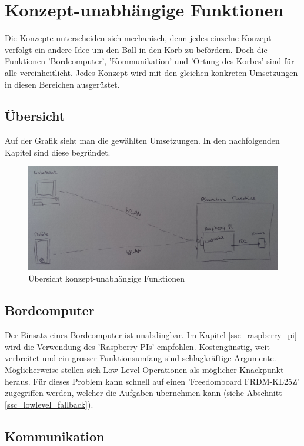 \section{Konzept-unabhängige Funktionen}
Die Konzepte unterscheiden sich mechanisch, denn jedes einzelne Konzept verfolgt ein andere Idee um den Ball in den Korb zu befördern. Doch die Funktionen 'Bordcomputer', 'Kommunikation' und 'Ortung des Korbes' sind für alle vereinheitlicht. Jedes Konzept wird mit den gleichen konkreten Umsetzungen in diesen Bereichen ausgerüstet.

\subsection{Übersicht}
Auf der Grafik sieht man die gewählten Umsetzungen. In den nachfolgenden Kapitel sind diese begründet.

\begin{figure}[h!]
	\centering
	\includegraphics[scale=0.15]{../../fig/konzeptunabhaengige_funktionen_overview.jpg}
	\caption{Übersicht konzept-unabhängige Funktionen}
	\label{fig:konzept1}
\end{figure}

\subsection{Bordcomputer}
Der Einsatz eines Bordcomputer ist unabdingbar. Im Kapitel \ref{ssc_raspberry_pi} wird die Verwendung des 'Raspberry PIs' empfohlen. Kostengünstig, weit verbreitet und ein grosser Funktionsumfang sind schlagkräftige Argumente. Möglicherweise stellen sich Low-Level Operationen als möglicher Knackpunkt heraus. Für dieses Problem kann schnell auf einen 'Freedomboard FRDM-KL25Z' zugegriffen werden, welcher die Aufgaben übernehmen kann (siehe Abschnitt \ref{ssc_lowlevel_fallback}).

\subsection{Kommunikation}

